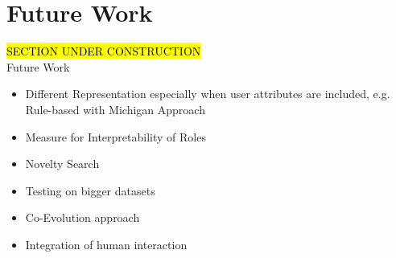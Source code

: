 \newpage
\chapter{Future Work}
\label{sec:futureWork}
\hl{SECTION UNDER CONSTRUCTION}\\
Future Work
\begin{itemize}
\item Different Representation especially when user attributes are included, e.g. Rule-based with Michigan Approach
\item Measure for Interpretability of Roles
\item Novelty Search
\item Testing on bigger datasets
\item Co-Evolution approach
\item Integration of human interaction
\end{itemize}
